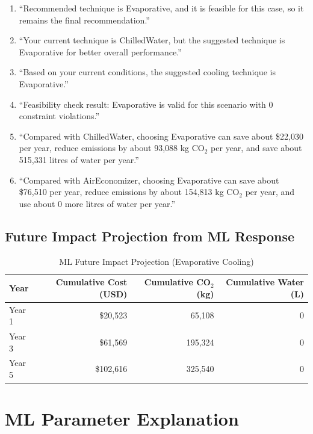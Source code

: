 \documentclass[12pt,a4paper]{report}
\begin{document}
\begin{enumerate}[noitemsep]
  \item ``Recommended technique is Evaporative, and it is feasible for this case, so it remains the final recommendation.''
  \item ``Your current technique is ChilledWater, but the suggested technique is Evaporative for better overall performance.''
  \item ``Based on your current conditions, the suggested cooling technique is Evaporative.''
  \item ``Feasibility check result: Evaporative is valid for this scenario with 0 constraint violations.''
  \item ``Compared with ChilledWater, choosing Evaporative can save about \$22{,}030 per year, reduce emissions by about 93{,}088 kg CO$_2$ per year, and save about 515{,}331 litres of water per year.''
  \item ``Compared with AirEconomizer, choosing Evaporative can save about \$76{,}510 per year, reduce emissions by about 154{,}813 kg CO$_2$ per year, and use about 0 more litres of water per year.''
\end{enumerate}

\subsection{Future Impact Projection from ML Response}

\begin{table}[H]
\centering
\caption{ML Future Impact Projection (Evaporative Cooling)}
\label{tab:ml_projection}
\renewcommand{\arraystretch}{1.3}
\begin{tabular}{lrrr}
\toprule
\textbf{Year} & \textbf{Cumulative Cost (USD)} & \textbf{Cumulative CO$_2$ (kg)} & \textbf{Cumulative Water (L)} \\
\midrule
Year 1 & \$20{,}523 & 65{,}108 & 0 \\
Year 3 & \$61{,}569 & 195{,}324 & 0 \\
Year 5 & \$102{,}616 & 325{,}540 & 0 \\
\bottomrule
\end{tabular}
\end{table}

\section{ML Parameter Explanation}
\end{document}
